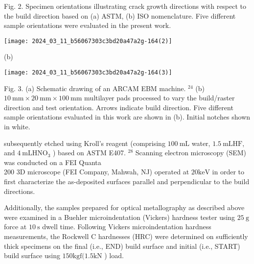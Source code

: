 \documentclass[10pt]{article}
\begin{document}
Fig. 2. Specimen orientations illustrating crack growth directions with respect to the build direction based on (a) ASTM, (b) ISO nomenclature. Five different sample orientations were evaluated in the present work.

\begin{center}
\texttt{[image: 2024\_03\_11\_b56067303c3bd20a47a2g-164(2)]}
\end{center}

(b)

\begin{center}
\texttt{[image: 2024\_03\_11\_b56067303c3bd20a47a2g-164(3)]}
\end{center}

Fig. 3. (a) Schematic drawing of an ARCAM EBM machine. ${ }^{24}$ (b) $10 \mathrm{~mm} \times 20 \mathrm{~mm} \times 100 \mathrm{~mm}$ multilayer pads processed to vary the build/raster direction and test orientation. Arrows indicate build direction. Five different sample orientations evaluated in this work are shown in (b). Initial notches shown in white.

subsequently etched using Kroll's reagent (comprising $100 \mathrm{~mL}$ water, $1.5 \mathrm{~mL} \mathrm{HF}$, and $4 \mathrm{~mL} \mathrm{HNO}_{3}$ ) based on ASTM E407. ${ }^{28}$ Scanning electron microscopy (SEM) was conducted on a FEI Quanta\\
200 3D microscope (FEI Company, Mahwah, NJ) operated at $20 \mathrm{keV}$ in order to first characterize the as-deposited surfaces parallel and perpendicular to the build directions.

Additionally, the samples prepared for optical metallography as described above were examined in a Buehler microindentation (Vickers) hardness tester using $25 \mathrm{~g}$ force at $10 \mathrm{~s}$ dwell time. Following Vickers microindentation hardness measurements, the Rockwell C hardnesses (HRC) were determined on sufficiently thick specimens on the final (i.e., END) build surface and initial (i.e., START) build surface using $150 \mathrm{kgf}(1.5 \mathrm{kN}$ ) load.
\end{document}
